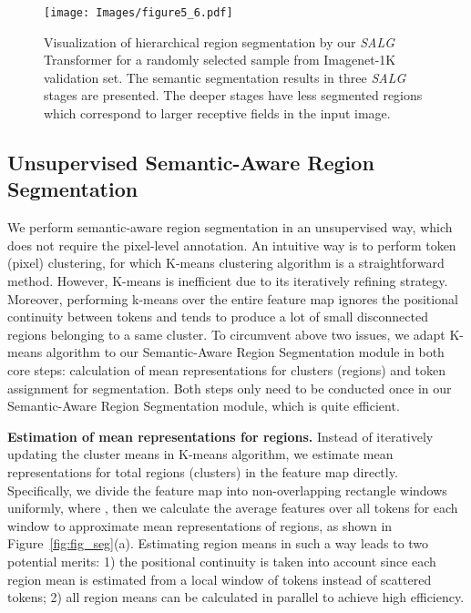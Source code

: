 \begin{figure*}[!t]
\centering
\texttt{[image: Images/figure5\_6.pdf]}
\caption{Visualization of hierarchical region segmentation by our \emph{SALG} Transformer for a randomly selected sample from Imagenet-1K validation set. The semantic segmentation results in three \emph{SALG} stages are presented. The deeper stages have less segmented regions which correspond to larger receptive fields in the input image.}
\label{fig:hie_segm}
\end{figure*}

\subsection{Unsupervised Semantic-Aware Region Segmentation}
\label{sec:3.2}
We perform semantic-aware region segmentation in an unsupervised way, which does not require the pixel-level annotation. An intuitive way is to perform token (pixel) clustering, for which K-means clustering algorithm is a straightforward method. However, K-means is inefficient due to its iteratively refining strategy. Moreover, performing k-means over the entire feature map ignores the positional continuity between tokens and tends to produce a lot of small disconnected regions belonging to a same cluster. To circumvent above two issues, we adapt K-means algorithm to our Semantic-Aware Region Segmentation module in both core steps: calculation of mean representations for clusters (regions) and token assignment for segmentation. Both steps only need to be conducted once in our Semantic-Aware Region Segmentation module, which is quite efficient.

\smallskip\noindent\textbf{Estimation of mean representations for regions.}
Instead of iteratively updating the cluster means in K-means algorithm, we estimate  mean representations for total  regions (clusters) in the feature map directly. Specifically, we divide the feature map into  non-overlapping rectangle windows uniformly, where , then we calculate the average features over all tokens for each window to approximate mean representations of  regions, as shown in Figure~\ref{fig:fig_seg}(a). Estimating region means in such a way leads to two potential merits: 1) the positional continuity is taken into account since each region mean is estimated from a local window of tokens instead of scattered tokens; 2) all region means can be calculated in parallel to achieve high efficiency. 

